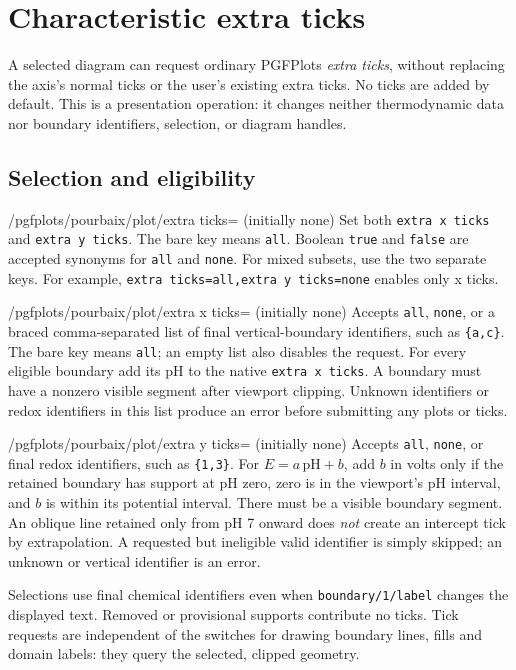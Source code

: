 \documentclass[a4paper,11pt]{ltxdoc}
\begin{document}
\section{Characteristic extra ticks}
\label{sec:extra-ticks}
A selected diagram can request ordinary PGFPlots \emph{extra ticks}, without
replacing the axis's normal ticks or the user's existing extra ticks. No ticks
are added by default. This is a presentation operation: it changes neither
thermodynamic data nor boundary identifiers, selection, or diagram handles.

\subsection{Selection and eligibility}
\begin{key}{/pgfplots/pourbaix/plot/extra ticks= (initially none)}
Set both \texttt{extra x ticks} and \texttt{extra y ticks}. The bare key means
\texttt{all}. Boolean \texttt{true} and \texttt{false} are accepted synonyms for
\texttt{all} and \texttt{none}. For mixed subsets, use the two separate keys.
For example, \texttt{extra ticks=all,extra y ticks=none} enables only x ticks.
\end{key}
\begin{key}{/pgfplots/pourbaix/plot/extra x ticks= (initially none)}
Accepts \texttt{all}, \texttt{none}, or a braced comma-separated list of final
vertical-boundary identifiers, such as \texttt{\{a,c\}}. The bare key means
\texttt{all}; an empty list also disables the request. For every eligible boundary
add its pH to the native \texttt{extra x ticks}. A boundary must have a nonzero
visible segment after viewport clipping. Unknown identifiers or redox identifiers
in this list produce an error before submitting any plots or ticks.
\end{key}
\begin{key}{/pgfplots/pourbaix/plot/extra y ticks= (initially none)}
Accepts \texttt{all}, \texttt{none}, or final redox identifiers, such as
\texttt{\{1,3\}}. For $E=a\,\mathrm{pH}+b$, add $b$ in volts only if the
retained boundary has support at pH zero, zero is in the viewport's pH interval,
and $b$ is within its potential interval. There must be a visible boundary
segment. An oblique line retained only from pH 7 onward does \emph{not} create an
intercept tick by extrapolation. A requested but ineligible valid identifier is
simply skipped; an unknown or vertical identifier is an error.
\end{key}
Selections use final chemical identifiers even when \texttt{boundary/1/label}
changes the displayed text. Removed or provisional supports contribute no ticks.
Tick requests are independent of the switches for drawing boundary lines, fills
and domain labels: they query the selected, clipped geometry.
\end{document}
